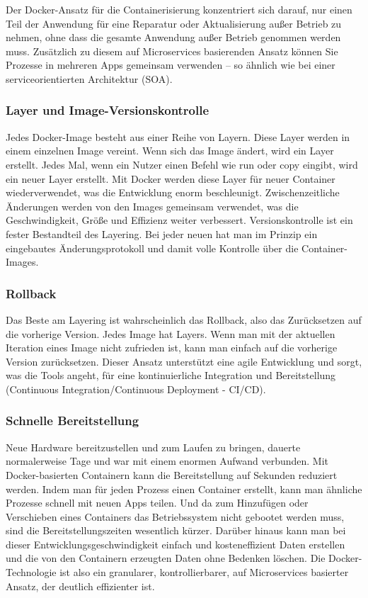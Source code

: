 Der Docker-Ansatz für die Containerisierung konzentriert sich darauf, nur einen Teil der Anwendung für eine Reparatur oder Aktualisierung außer Betrieb zu nehmen, 
ohne dass die gesamte Anwendung außer Betrieb genommen werden muss. Zusätzlich zu diesem auf Microservices basierenden Ansatz können Sie Prozesse 
in mehreren Apps gemeinsam verwenden – so ähnlich wie bei einer serviceorientierten Architektur (SOA).
\cite{sysarch-docker-1}

\subsubsection{Layer und Image-Versionskontrolle}

Jedes Docker-Image besteht aus einer Reihe von Layern. Diese Layer werden in einem einzelnen Image vereint. Wenn sich das Image ändert, wird ein Layer erstellt. 
Jedes Mal, wenn ein Nutzer einen Befehl wie run oder copy eingibt, wird ein neuer Layer erstellt. Mit Docker werden diese Layer für neuer Container wiederverwendet, 
was die Entwicklung enorm beschleunigt. Zwischenzeitliche Änderungen werden von den Images gemeinsam verwendet, was die Geschwindigkeit, Größe und Effizienz weiter verbessert. 
Versionskontrolle ist ein fester Bestandteil des Layering. Bei jeder neuen hat man im Prinzip ein eingebautes Änderungsprotokoll und damit volle Kontrolle über die Container-Images.
\cite{sysarch-docker-1}

\subsubsection{Rollback}

Das Beste am Layering ist wahrscheinlich das Rollback, also das Zurücksetzen auf die vorherige Version. Jedes Image hat Layers. Wenn man mit der aktuellen Iteration eines Image nicht zufrieden ist, kann man einfach
auf die vorherige Version zurücksetzen. Dieser Ansatz unterstützt eine agile Entwicklung und sorgt, was die Tools angeht, 
für eine kontinuierliche Integration und Bereitstellung (Continuous Integration/Continuous Deployment - CI/CD).
\cite{sysarch-docker-1}

\subsubsection{Schnelle Bereitstellung}

Neue Hardware bereitzustellen und zum Laufen zu bringen, dauerte normalerweise Tage und war mit einem enormen Aufwand verbunden. Mit Docker-basierten Containern kann die Bereitstellung auf Sekunden reduziert werden. 
Indem man für jeden Prozess einen Container erstellt, kann man ähnliche Prozesse schnell mit neuen Apps teilen. Und da zum Hinzufügen oder Verschieben eines Containers das 
Betriebssystem nicht gebootet werden muss, sind die Bereitstellungszeiten wesentlich kürzer. Darüber hinaus kann man bei dieser Entwicklungsgeschwindigkeit 
einfach und kosteneffizient Daten erstellen und die von den Containern erzeugten Daten ohne Bedenken löschen.
Die Docker-Technologie ist also ein granularer, kontrollierbarer, auf Microservices basierter Ansatz, der deutlich effizienter ist.
\cite{sysarch-docker-1}

